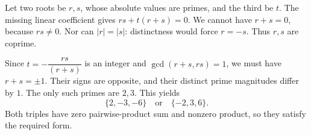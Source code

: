Let two roots be $r,s$, whose absolute values are primes, and the third be $t$. The missing linear coefficient gives $rs+t(r+s)=0$. We cannot have $r+s=0$, because $rs\ne0$. Nor can $|r|=|s|$: distinctness would force $r=-s$. Thus $r,s$ are coprime.

Since $t=-\dfrac{rs}{(r+s)}$ is an integer and $\gcd(r+s,rs)=1$, we must have $r+s=\pm1$. Their signs are opposite, and their distinct prime magnitudes differ by $1$. The only such primes are $2,3$. This yields
\[
\boxed{\{2,-3,-6\}\quad\text{or}\quad\{-2,3,6\}}.
\]
Both triples have zero pairwise-product sum and nonzero product, so they satisfy the required form.

